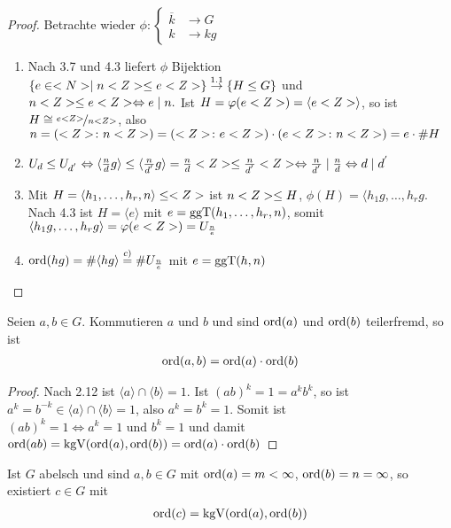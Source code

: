 \begin{proof}
	Betrachte wieder $\phi \colon \begin{cases}
	\overline{k} &\to G \\
	k &\to kg
	\end{cases}$
	\begin{enumerate}
		\item Nach 3.7 und 4.3 liefert $\phi$ Bijektion $\{ e \in <N> \mid n<Z> \leq e<Z> \} \overset{1.1}{\rightarrow} \{ H \leq G \}$ und $n<Z> \leq e<Z> \Leftrightarrow e \mid n.$ Ist $H = \varphi(e<Z>) = \langle e<Z> \rangle$, so ist $H \cong \nicefrac{e<Z>}{n<Z>}$, also $n = (<Z> \colon n <Z>) = (<Z> \colon e<Z>)\cdot(e<Z> \colon n<Z>) = e \cdot \#H$
		\item $U_d \leq U_{d^{'}} \Leftrightarrow \langle \frac{n}{d}g \rangle \leq \langle \frac{n}{d^{'}}g \rangle = \frac{n}{d}<Z> \leq \frac{n}{d^{'}}<Z> \Leftrightarrow \frac{n}{d^{'}} \mid \frac{n}{d} \Leftrightarrow d \mid d^{'}$
		\item Mit $H = \langle h_1, \dots, h_r,n \rangle \leq <Z>$ ist $n<Z> \leq H$, $\phi(H) = \langle h_1 g, \dots, h_r g$. Nach 4.3 ist $H = \langle e \rangle$ mit $e = \operatorname{ggT}(h_1, \dots, h_r, n)$, somit $\langle h_1 g, \dots, h_r g \rangle = \varphi(e<Z>) = U_{\frac{n}{e}}$
		\item $\operatorname{ord}(hg) = \#\langle hg \rangle \overset{c)}{=} \#U_{\frac{n}{e}}$ mit $e = \operatorname{ggT}(h,n)$
	\end{enumerate}
\end{proof}

\begin{lemma}
	Seien $a,b \in G$. Kommutieren $a \text{ und } b$ und sind $\operatorname{ord}(a)$ und $\operatorname{ord}(b)$ teilerfremd, so ist
	\begin{align}
		\operatorname{ord}(a,b) = \operatorname{ord}(a)\cdot \operatorname{ord}(b) \notag
	\end{align}
\end{lemma}

\begin{proof}
	Nach 2.12 ist $\langle a \rangle \cap \langle b \rangle = 1$. Ist $(ab)^k = 1 = a^k b^k$, so ist $a^k = b^{-k} \in \langle a \rangle \cap \langle b \rangle = 1$, also $a^k = b^k = 1$. Somit ist $(ab)^k = 1 \Leftrightarrow a^k = 1 \text{ und } b^k =1$ und damit $\operatorname{ord}(ab) = \operatorname{kgV}(\operatorname{ord}(a), \operatorname{ord}(b)) = \operatorname{ord}(a) \cdot \operatorname{ord}(b)$
\end{proof}

\begin{conclusion}
	Ist $G$ abelsch und sind $a,b \in G$ mit $\operatorname{ord}(a) = m < \infty$, $\operatorname{ord}(b) = n = \infty$, so existiert $c \in G$ mit
	\begin{align}
		\operatorname{ord}(c) = \operatorname{kgV}(\operatorname{ord}(a), \operatorname{ord}(b)) \notag
	\end{align}
\end{conclusion}

